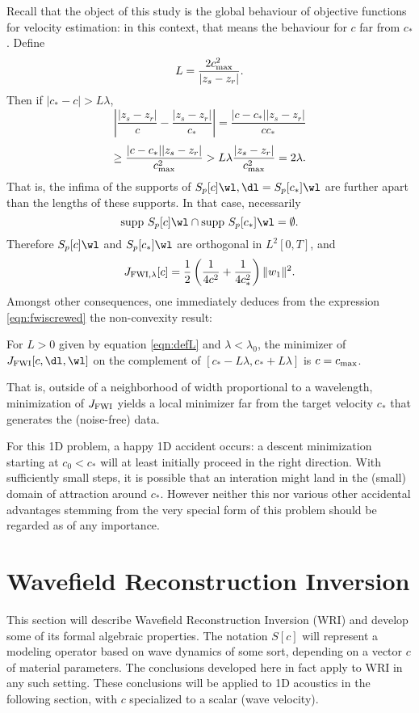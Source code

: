 Recall that the object of this study is the global behaviour of
objective functions for velocity estimation: in this context, that
means the behaviour for $c$ far from $c_*$. Define
\begin{equation}
  \label{eqn:defL}
  L = \frac{2 c_{\rm max}^2}{|z_s-z_r|}.
\end{equation}
Then if $|c_*-c| > L\lambda$,
\[
  \left|\frac{|z_s-z_r|}{c}-\frac{|z_s-z_r|}{c_*}\right|
  =\frac{|c-c_*||z_s-z_r|}{cc_*} 
\]
\[
\ge \frac{|c-c_*||z_s-z_r|}{c_{\rm max}^2} > L\lambda
\frac{|z_s-z_r|}{c_{\rm max}^2} = 2\lambda.
\]
That is, the infima of the supports of $S_p[c]\wl, \dl=S_p[c_*]\wl$
are further apart than the lengths of these supports. In that case,
necessarily
\[
  \mbox{supp }S_p[c]\wl \cap \mbox{supp }S_p[c_*]\wl = \emptyset.
\]
Therefore $S_p[c]\wl$ and $S_p[c_*]\wl$ are orthogonal in $L^2[0,T]$,
and
\begin{equation}
  \label{eqn:fwiscrewed}
  J_{\rm FWI,\lambda}[c] =
  \frac{1}{2}\left(\frac{1}{4c^2}+\frac{1}{4c_*^2}\right)\|w_1\|^2.
\end{equation}
Amongst other consequences, one immediately deduces from the
expression \ref{eqn:fwiscrewed} the non-convexity result:

\begin{theorem}
  \label{thm:thm1}
  For $L>0$ given by equation \ref{eqn:defL} and $\lambda <
  \lambda_0$, the minimizer of $J_{\rm FWI}[c,\dl,\wl]$ on the
  complement of $[c_*-L\lambda, c_*+L\lambda]$ is $c=c_{\rm max}$.
\end{theorem}

That is, outside of a neighborhood of width proportional to a
wavelength, minimization of $J_{\rm FWI}$ yields a local minimizer far from
the target velocity $c_*$ that generates the (noise-free) data.

For this 1D problem, a happy 1D accident occurs: a descent
minimization starting at $c_0 < c_*$ will at least initially proceed
in the right direction. With sufficiently small steps, it is possible
that an interation might land in the (small) domain of attraction
around $c_*$. However neither this nor various other accidental
advantages stemming from the very special form of this problem should
be regarded as of any importance.
 
\section{Wavefield Reconstruction Inversion}
This section will describe Wavefield Reconstruction Inversion (WRI)
and develop some of its formal algebraic properties. The notation
$S[c]$ will represent a modeling operator based on wave dynamics of
some sort, depending on a vector $c$ of material parameters. The
conclusions developed here in fact apply to WRI in any such
setting. These conclusions will be applied to 1D acoustics in the
following section, with $c$ specialized to a scalar (wave velocity).


